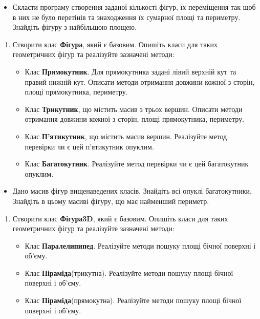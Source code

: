 \documentclass[]{article}
\begin{document}
\begin{itemize}
\item
  Скласти програму створення заданої кількості фігур, їх переміщення так
  щоб в них не було перетінів та знаходження їх сумарної площі та
  периметру. Знайдіть фігуру з найбільшою площею.
\end{itemize}

\begin{enumerate}
\def\labelenumi{\arabic{enumi}.}
\item
  Створити клас \textbf{Фігура}, який є базовим. Опишіть класи для таких
  геометричних фігур та реалізуйте зазначені методи:

  \begin{itemize}
  \item
    Клас \textbf{Прямокутник}. Для прямокутника задані лівий верхній кут
    та правий нижній кут. Описати методи отримання довжини кожної з
    сторін, площі прямокутника, периметру.
  \item
    Клас \textbf{Трикутник}, що містить масив з трьох вершин. Описати
    методи отримання довжини кожної з сторін, площі прямокутника,
    периметру.
  \item
    Клас \textbf{П'ятикутник}, що містить масив вершин. Реалізуйте метод
    перевірки чи є цей п'ятикутник опуклим.
  \item
    Клас \textbf{Багатокутник}. Реалізуйте метод перевірки чи є цей
    багатокутник опуклим.
  \end{itemize}
\end{enumerate}

\begin{itemize}
\item
  Дано масив фігур вищенаведених класів. Знайдіть всі опуклі
  багатокутники. Знайдіть в цьому масиві фігуру, що має найменший
  периметр.
\end{itemize}

\begin{enumerate}
\def\labelenumi{\arabic{enumi}.}
\item
  Створити клас \textbf{Фігура3D}, який є базовим. Опишіть класи для
  таких геометричних фігур та реалізуйте зазначені методи:

  \begin{itemize}
  \item
    Клас \textbf{Паралелипипед}. Реалізуйте методи пошуку площі бічної
    поверхні і об'єму.
  \item
    Клас \textbf{Піраміда}(трикутна). Реалізуйте методи пошуку площі
    бічної поверхні і об'єму.
  \item
    Клас \textbf{Піраміда}(прямокутна). Реалізуйте методи пошуку площі
    бічної поверхні і об'єму.
  \end{itemize}
\end{enumerate}
\end{document}

